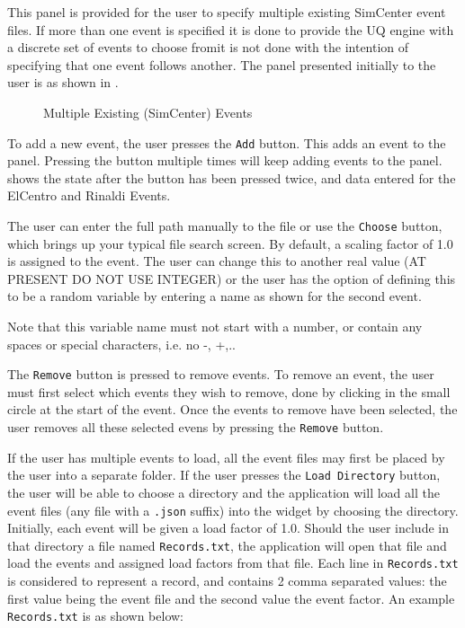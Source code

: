 This panel is provided for the user to specify multiple existing SimCenter
event files.  If more than one event is specified it is done to
provide the UQ engine with a discrete set of events to choose
from\textemdash it is not done with the intention of specifying that
one event follows another.  The panel presented initially to the user
is as shown in .

\begin{figure}[!htbp]
  \caption{Multiple Existing (SimCenter) Events }
  \label{fig:figure4}
\end{figure}

To add a new event, the user presses the \texttt{Add} button. This adds an
event to the panel. Pressing the button multiple times will keep
adding events to the panel.  shows the state after
the button has been pressed twice, and data entered for the ElCentro
and Rinaldi Events.

The user can enter the full path manually to the file or use the
\texttt{Choose} button, which brings up your typical file search screen.  By
default, a scaling factor of 1.0 is assigned to the event.  The user
can change this to another real value (AT PRESENT DO NOT USE INTEGER)
or the user has the option of defining this to be a random variable by
entering a name as shown for the second event.

Note that this variable name must not start with a number, or contain
any spaces or special characters, i.e. no -, +,..

The \texttt{Remove} button is pressed to remove events. To remove an
event, the user must first select which events they wish to remove,
done by clicking in the small circle at the start of the event. Once
the events to remove have been selected, the user removes all these
selected evens by pressing the \texttt{Remove} button.

If the user has multiple events to load, all the event files may first
be placed by the user into a separate folder. If the user presses the
\texttt{Load Directory} button, the user will be able to choose a directory and the
application will load all the event files (any file with a \texttt{.json}
suffix) into the widget by choosing the directory. Initially, each
event will be given a load factor of 1.0.  Should the user include in
that directory a file named \texttt{Records.txt}, the application will open that
file and load the events and assigned load factors from that
file. Each line in \texttt{Records.txt} is considered to represent a record, and
contains 2 comma separated values: the first value being the event
file and the second value the event factor. An example \texttt{Records.txt} is
as shown below:


